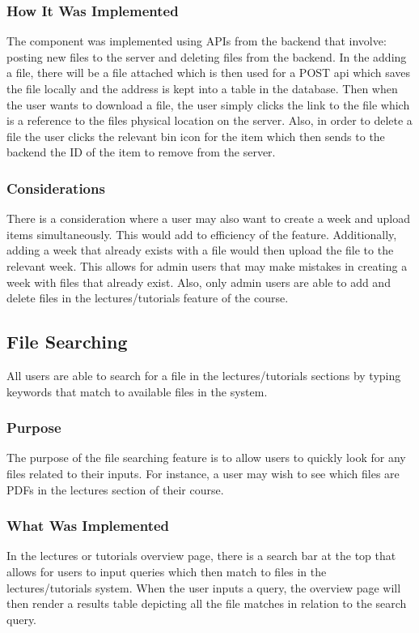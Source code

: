 \subsubsection{How It Was Implemented}
The component was implemented using APIs from the backend that involve: posting new files to the server and deleting files from the backend. In the adding a file, there will be a file attached which is then used for a POST api which saves the file locally and the address is kept into a table in the database. Then when the user wants to download a file, the user simply clicks the link to the file which is a reference to the files physical location on the server. Also, in order to delete a file the user clicks the relevant bin icon for the item which then sends to the backend the ID of the item to remove from the server.

\subsubsection{Considerations}
There is a consideration where a user may also want to create a week and upload items simultaneously. This would add to efficiency of the feature. Additionally, adding a week that already exists with a file would then upload the file to the relevant week. This allows for admin users that may make mistakes in creating a week with files that already exist. Also, only admin users are able to add and delete files in the lectures/tutorials feature of the course.

\subsection{File Searching}
All users are able to search for a file in the lectures/tutorials sections by typing keywords that match to available files in the system.

\subsubsection{Purpose}
The purpose of the file searching feature is to allow users to quickly look for any files related to their inputs. For instance, a user may wish to see which files are PDFs in the lectures section of their course.

\subsubsection{What Was Implemented}
In the lectures or tutorials overview page, there is a search bar at the top that allows for users to input queries which then match to files in the lectures/tutorials system. When the user inputs a query, the overview page will then render a results table depicting all the file matches in relation to the search query.

